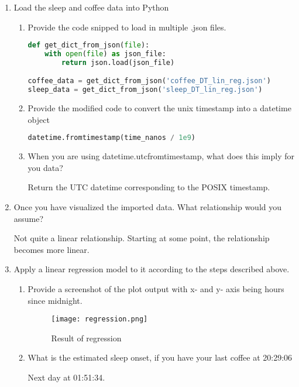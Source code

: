 \documentclass{homework}
\begin{document}
\exercise
\begin{enumerate}
	\item Load the sleep and coffee data into Python
	\begin{enumerate}[label=\alph*)]
		\item Provide the code snipped to load in multiple .json files.
		\begin{lstlisting}[language=Python, caption=  load in multiple .json files, basicstyle=\small]
def get_dict_from_json(file):
    with open(file) as json_file:
        return json.load(json_file)

coffee_data = get_dict_from_json('coffee_DT_lin_reg.json')
sleep_data = get_dict_from_json('sleep_DT_lin_reg.json')
		\end{lstlisting}
		\item Provide the modified code to convert the unix timestamp into a datetime object
		\begin{lstlisting}[language=Python, caption= convert the unix timestamp into a datetime object, basicstyle=\small]
datetime.fromtimestamp(time_nanos / 1e9)
		\end{lstlisting}
		\item When you are using datetime.utcfromtimestamp, what does this imply for you data?

		Return the UTC datetime corresponding to the POSIX timestamp.
	\end{enumerate}
	\item Once you have visualized the imported data. What relationship would you assume?

		Not quite a linear relationship. Starting at some point, the relationship becomes more linear.
	\item Apply a linear regression model to it according to the steps described above.
	\begin{enumerate}[label=\alph*)]
		\item Provide a screenshot of the plot output with x- and y- axis being hours since midnight.
		\begin{figure}[hbt!]
			\centering
			\texttt{[image: regression.png]}
			\caption{Result of regression}
		\end{figure}
		\item What is the estimated sleep onset, if you have your last coffee at 20:29:06

			Next day at 01:51:34.
	\end{enumerate}

\end{enumerate}
\end{document}
